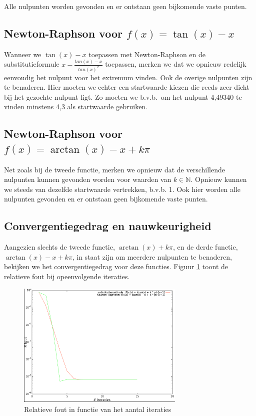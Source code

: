\documentclass[12pt,a4paper]{article}
\begin{document}
Alle nulpunten worden gevonden en er ontstaan geen bijkomende vaste punten.

\subsection{Newton-Raphson voor $f(x) = \tan(x) - x$}

Wanneer we $\tan(x) - x$ toepassen met Newton-Raphson en de substitutieformule $x - \frac{tan(x) - x}{tan(x)^2}$ toepassen, merken we dat we opnieuw redelijk eenvoudig het nulpunt voor het extremum vinden. Ook de overige nulpunten zijn te benaderen. Hier moeten we echter een startwaarde kiezen die reeds zeer dicht bij het gezochte nulpunt ligt. Zo moeten we b.v.b.\ om het nulpunt 4,49340 te vinden minstens 4,3 als startwaarde gebruiken.

\subsection{Newton-Raphson voor $f(x) = \arctan(x) - x + k\pi$}

Net zoals bij de tweede functie, merken we opnieuw dat de verschillende nulpunten kunnen gevonden worden voor waarden van $k \in \mathbb{N}$. Opnieuw kunnen we steeds van dezelfde startwaarde vertrekken, b.v.b. 1. Ook hier worden alle nulpunten gevonden en er ontstaan geen bijkomende vaste punten.

\subsection{Convergentiegedrag en nauwkeurigheid}

Aangezien slechts de tweede functie, $\arctan(x) + k\pi$, en de derde functie, $\arctan(x) - x + k\pi$, in staat zijn om meerdere nulpunten te benaderen, bekijken we het convergentiegedrag voor deze functies. Figuur \ref{fig:convergentie-error} toont de relatieve fout bij opeenvolgende iteraties.

\begin{figure}
\begin{center}
 \includegraphics[width=80mm]{resources/convergentie-error.pdf}
 \caption{Relatieve fout in functie van het aantal iteraties}
  \label{fig:convergentie-error}
\end{center}
\end{figure}
\end{document}
